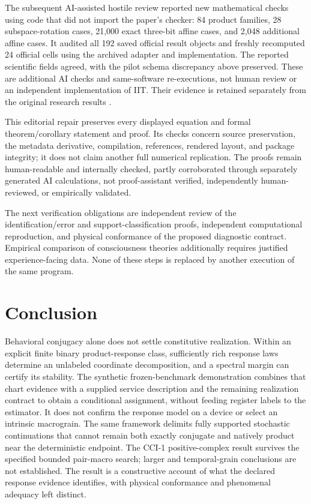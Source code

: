 \documentclass[11pt]{article}
\theoremstyle{definition}\newtheorem{definition}[theorem]{Definition}
\theoremstyle{remark}\newtheorem{remark}[theorem]{Remark}
\begin{document}
The subsequent AI-assisted hostile review reported new mathematical checks using code that did not import the paper's checker: 84 product families, 28 subspace-rotation cases, 21,000 exact three-bit affine cases, and 2,048 additional affine cases. It audited all 192 saved official result objects and freshly recomputed 24 official cells using the archived adapter and implementation. The reported scientific fields agreed, with the pilot schema discrepancy above preserved. These are additional AI checks and same-software re-executions, not human review or an independent implementation of IIT. Their evidence is retained separately from the original research results \cite{support}.

This editorial repair preserves every displayed equation and formal theorem/corollary statement and proof. Its checks concern source preservation, the metadata derivative, compilation, references, rendered layout, and package integrity; it does not claim another full numerical replication. The proofs remain human-readable and internally checked, partly corroborated through separately generated AI calculations, not proof-assistant verified, independently human-reviewed, or empirically validated.

The next verification obligations are independent review of the identification/error and support-classification proofs, independent computational reproduction, and physical conformance of the proposed diagnostic contract. Empirical comparison of consciousness theories additionally requires justified experience-facing data. None of these steps is replaced by another execution of the same program.

\section{Conclusion}
Behavioral conjugacy alone does not settle constitutive realization. Within an explicit finite binary product-response class, sufficiently rich response laws determine an unlabeled coordinate decomposition, and a spectral margin can certify its stability. The synthetic frozen-benchmark demonstration combines that chart evidence with a supplied service description and the remaining realization contract to obtain a conditional assignment, without feeding register labels to the estimator. It does not confirm the response model on a device or select an intrinsic macrograin. The same framework delimits fully supported stochastic continuations that cannot remain both exactly conjugate and natively product near the deterministic endpoint. The CCI-1 positive-complex result survives the specified bounded pair-macro search; larger and temporal-grain conclusions are not established. The result is a constructive account of what the declared response evidence identifies, with physical conformance and phenomenal adequacy left distinct.
\end{document}
